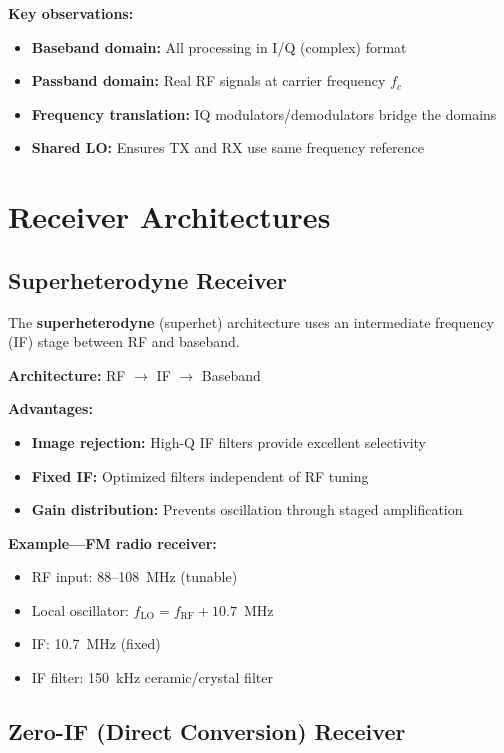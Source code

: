 \textbf{Key observations:}
\begin{itemize}
\item \textbf{Baseband domain:} All processing in I/Q (complex) format
\item \textbf{Passband domain:} Real RF signals at carrier frequency $f_c$
\item \textbf{Frequency translation:} IQ modulators/demodulators bridge the domains
\item \textbf{Shared LO:} Ensures TX and RX use same frequency reference
\end{itemize}

\section{Receiver Architectures}

\subsection{Superheterodyne Receiver}

The \textbf{superheterodyne} (superhet) architecture uses an intermediate frequency (IF) stage between RF and baseband.

\textbf{Architecture:} RF $\rightarrow$ IF $\rightarrow$ Baseband

\textbf{Advantages:}
\begin{itemize}
\item \textbf{Image rejection:} High-Q IF filters provide excellent selectivity
\item \textbf{Fixed IF:} Optimized filters independent of RF tuning
\item \textbf{Gain distribution:} Prevents oscillation through staged amplification
\end{itemize}

\textbf{Example---FM radio receiver:}
\begin{itemize}
\item RF input: 88--108~MHz (tunable)
\item Local oscillator: $f_{\text{LO}} = f_{\text{RF}} + 10.7$~MHz
\item IF: 10.7~MHz (fixed)
\item IF filter: 150~kHz ceramic/crystal filter
\end{itemize}

\subsection{Zero-IF (Direct Conversion) Receiver}

